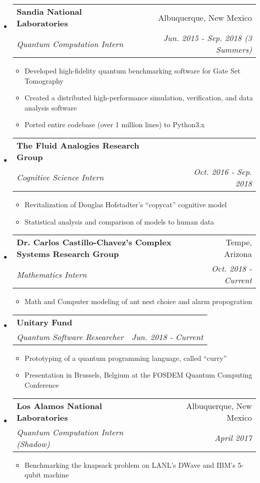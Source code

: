\documentclass[letterpaper,11pt]{article}
\makeatletter
\newcommand{\resitem}[1]{\item #1 \vspace{-2pt}}
\newcommand{\resheading}[1]{
{\large \parashade[.9]{sharpcorners}{\textbf{\underline{#1} \vphantom{p\^{E}}}}}
}
\newcommand{\colfill}{@{\extracolsep{\fill}}}
\newcommand{\ressubheading}[4]{
\begin{tabular*}{6.5in}{l\colfill r}
		\textbf{#1} & #2 \\
		\textit{#3} & \textit{#4} \\
\end{tabular*}\vspace{-6pt}}
\makeatother
\begin{document}
\resheading{Experience}
\begin{itemize}
 \item
     \ressubheading{Sandia National Laboratories}{Albuquerque, New Mexico}{Quantum Computation Intern}{Jun. 2015 - Sep. 2018 (3 Summers)}
 	\begin{itemize}
        \resitem{Developed high-fidelity quantum benchmarking software for Gate Set Tomography}
 		\resitem{Created a distributed high-performance simulation, verification, and data analysis software}
        \resitem{Ported entire codebase (over 1 million lines) to Python3.x}
 	\end{itemize}
 \item
     \ressubheading{The Fluid Analogies Research Group}{}{Cognitive Science Intern}{Oct. 2016 - Sep. 2018}
 	\begin{itemize}
 		\resitem{Revitalization of Douglas Hofstadter's ``copycat'' cognitive model}
 		\resitem{Statistical analysis and comparison of models to human data}
 	\end{itemize}
 \item
     \ressubheading{Dr. Carlos Castillo-Chavez's Complex Systems Research Group}{Tempe, Arizona}{Mathematics Intern}{Oct. 2018 - Current}
 	\begin{itemize}
 		\resitem{Math and Computer modeling of ant nest choice and alarm propogration}
 	\end{itemize}
 \item
     \ressubheading{Unitary Fund}{}{Quantum Software Researcher}{Jun. 2018 - Current}
 	\begin{itemize}
            \resitem{Prototyping of a quantum programming language, called ``curry''}
            \resitem{Presentation in Brussels, Belgium at the FOSDEM Quantum Computing Conference}
 	\end{itemize}
 \item
     \ressubheading{Los Alamos National Laboratories}{Albuquerque, New Mexico}{Quantum Computation Intern (Shadow)}{April 2017}
 	\begin{itemize}
 		\resitem{Benchmarking the knapsack problem on LANL's DWave and IBM's 5-qubit machine}
 	\end{itemize}
\end{itemize}
\end{document}
